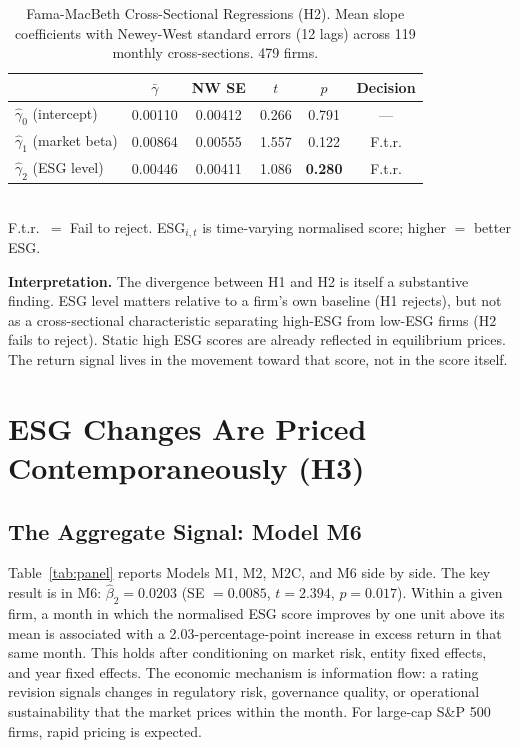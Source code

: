\begin{table}[H]
  \centering
  \caption{Fama-MacBeth Cross-Sectional Regressions (H2). Mean slope coefficients with Newey-West standard errors (12 lags) across 119 monthly cross-sections. 479 firms.}
  \label{tab:fm}
  \begin{tabular}{lccccc}
    \toprule
    & $\bar{\gamma}$ & NW SE & $t$ & $p$ & Decision \\
    \midrule
    $\hat{\gamma}_0$ (intercept)   & 0.00110 & 0.00412 & 0.266 & 0.791 & --- \\
    $\hat{\gamma}_1$ (market beta) & 0.00864 & 0.00555 & 1.557 & 0.122 & F.t.r. \\
    $\hat{\gamma}_2$ (ESG level)   & 0.00446 & 0.00411 & 1.086 & \textbf{0.280} & F.t.r. \\
    \bottomrule
  \end{tabular}
  \smallskip\\
  \footnotesize F.t.r.\ $=$ Fail to reject. ESG$_{i,t}$ is time-varying normalised score; higher $=$ better ESG.
\end{table}



\noindent\textbf{Interpretation.} The divergence between H1 and H2 is itself a substantive finding. ESG level matters relative to a firm's own baseline (H1 rejects), but not as a cross-sectional characteristic separating high-ESG from low-ESG firms (H2 fails to reject). Static high ESG scores are already reflected in equilibrium prices. The return signal lives in the movement toward that score, not in the score itself.

\section{ESG Changes Are Priced Contemporaneously (H3)}
\label{sec:change}

\subsection*{The Aggregate Signal: Model M6}

Table~\ref{tab:panel} reports Models M1, M2, M2C, and M6 side by side. The key result is in M6: $\hat{\beta}_2 = 0.0203$ (SE $= 0.0085$, $t = 2.394$, $p = 0.017$). Within a given firm, a month in which the normalised ESG score improves by one unit above its mean is associated with a 2.03-percentage-point increase in excess return in that same month. This holds after conditioning on market risk, entity fixed effects, and year fixed effects. The economic mechanism is information flow: a rating revision signals changes in regulatory risk, governance quality, or operational sustainability that the market prices within the month. For large-cap S\&P 500 firms, rapid pricing is expected.

